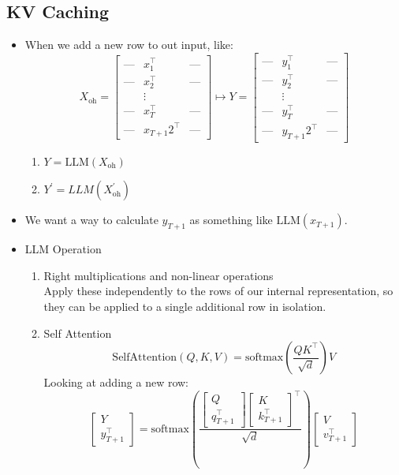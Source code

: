\documentclass{article}
\begin{document}
\subsection*{KV Caching}
\begin{itemize}
\item When we add a new row to out input, like:
$$X_\mathrm{oh} = 
\begin{bmatrix}
    \text{---} & x_1^\intercal & \text{---} \\
    \text{---} & x_2^\intercal & \text{---} \\
    &\vdots& \\
    \text{---} & x_T^\intercal & \text{---} \\
    \text{---} & x_{T+1}2^\intercal & \text{---}
\end{bmatrix}
\mapsto Y = 
\begin{bmatrix}
    \text{---} & y_1^\intercal & \text{---} \\
    \text{---} & y_2^\intercal & \text{---} \\
    &\vdots& \\
    \text{---} & y_T^\intercal & \text{---} \\
    \text{---} & y_{T+1}2^\intercal & \text{---}
\end{bmatrix}
$$
\begin{enumerate}
\item $Y = \mathrm{LLM}(X_\mathrm{oh})$
\item $Y^\prime = LLM(X^\prime_\mathrm{oh})$
\end{enumerate}
\item We want a way to calculate $y_{T+1}$ as something like $\mathrm{LLM}(x_{T+1})$.
\item LLM Operation
\begin{enumerate}
\item Right multiplications and non-linear operations\\
Apply these independently to the rows of our internal representation, so they can be applied to a single additional row in isolation.
\item Self Attention
$$\mathrm{SelfAttention}(Q, K, V) =  \mathrm{softmax}\left(\frac{QK^\intercal}{\sqrt{d}}\right)V$$
Looking at adding a new row:
$$\begin{bmatrix}Y\\y_{T+1}^\intercal\end{bmatrix} = \mathrm{softmax}
\left(\frac{
\begin{bmatrix}Q\\q_{T+1}^\intercal\end{bmatrix}
\begin{bmatrix}K\\k_{T+1}^\intercal\end{bmatrix}
^\intercal}{\sqrt{d}}\right)
\begin{bmatrix}V\\v_{T+1}^\intercal\end{bmatrix}
$$
\end{enumerate}


\end{itemize}
\end{document}
